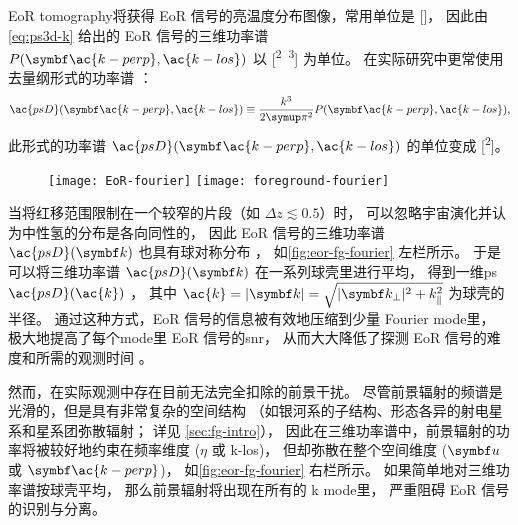 EoR \ac{tomography}将获得 EoR 信号的亮温度分布图像，常用单位是 [\si{\mK}]，
因此由\autoref{eq:ps3d-k} 给出的 EoR 信号的三维功率谱
$P(\B{\ac{k-perp}}, \ac{k-los})$ 以 [\si{\mK\squared\Mpc\cubed}] 为单位。
在实际研究中更常使用去量纲形式的功率谱 \cite{peacock1996}：
\begin{equation}
  \label{eq:ps3d-k2}
  \ac{psD}(\B{\ac{k-perp}}, \ac{k-los})
    \equiv \frac{k^3}{2\Cpi^2} P(\B{\ac{k-perp}}, \ac{k-los}) ,
\end{equation}
此形式的功率谱 $\ac{psD}(\B{\ac{k-perp}}, \ac{k-los})$
的单位变成 [\si{\mK\squared}]。

\begin{figure}[htp]
  \centering
  \texttt{[image: EoR-fourier]}%
  \texttt{[image: foreground-fourier]}
  \label{fig:eor-fg-fourier}
\end{figure}

当将红移范围限制在一个较窄的片段（如 $\Delta z \lesssim 0.5$）时，
可以忽略宇宙演化并认为中性氢的分布是各向同性的，
因此 EoR 信号的三维功率谱 $\ac{psD}(\B{k})$ 也具有球对称分布
\cite{morales2004,mcQuinn2006}，
如\autoref{fig:eor-fg-fourier} 左栏所示。
于是可以将三维功率谱 $\ac{psD}(\B{k})$ 在一系列球壳里进行平均，
得到一维\ac{ps} $\ac{psD}(\ac{k})$ \cite{morales2004,datta2010}，
其中 $\ac{k} = |\B{k}| = \sqrt{|\B{k}_{\perp}|^2 + k_{\parallel}^2}$
为球壳的半径。
通过这种方式，EoR 信号的信息被有效地压缩到少量 Fourier \ac{mode}里，
极大地提高了每个\ac{mode}里 EoR 信号的\ac{snr}，
从而大大降低了探测 EoR 信号的难度和所需的观测时间 \cite{datta2010}。

然而，在实际观测中存在目前无法完全扣除的前景干扰。
尽管前景辐射的频谱是光滑的，但是具有非常复杂的空间结构
（如银河系的子结构、形态各异的射电星系和星系团弥散辐射；
详见 \autoref{sec:fg-intro}），
因此在三维功率谱中，前景辐射的功率将被较好地约束在频率维度
($\eta$ 或 \ac{k-los})，
但却弥散在整个空间维度 ($\B{u}$ 或 $\B{\ac{k-perp}}$)，
如\autoref{fig:eor-fg-fourier} 右栏所示。
如果简单地对三维功率谱按球壳平均，
那么前景辐射将出现在所有的 \ac{k} \ac{mode}里，
严重阻碍 EoR 信号的识别与分离。

